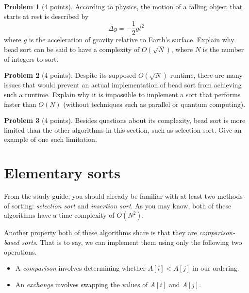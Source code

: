 \documentclass{exam}
\theoremstyle{definition}
\newtheorem{problem}{Problem}[section]
\theoremstyle{definition}
\begin{document}
\begin{problem}[4 points]
    According to physics, the motion of a falling object that starts at rest is described by
    $$ \Delta y = -\frac{1}{2} g t^2 $$
    where $ g $ is the acceleration of gravity relative to Earth's surface. Explain why bead sort can be said to have a complexity of $ O(\sqrt{N}) $, where $ N $ is the number of integers to sort.
\end{problem}

\begin{problem}[4 points]
    Despite its supposed $ O(\sqrt{N}) $ runtime, there are many issues that would prevent an actual implementation of bead sort from achieving such a runtime. 
    Explain why it is impossible to implement a sort that performs faster than $O(N)$ (without techniques such as parallel or quantum computing). 
\end{problem}


\begin{problem}[4 points]
    Besides questions about its complexity, bead sort is more limited than the other algorithms in this section, such as selection sort. Give an example of one such limitation.
\end{problem}



\section{Elementary sorts}

From the study guide, you should already be familiar with at least two methods of sorting: \textit{selection sort} and \textit{insertion sort}. As you may know, both of these algorithms have a time complexity of $O(N^2)$.

Another property both of these algorithms share is that they are \textit{comparison-based sorts}. That is to say, we can implement them using only the following two operations.

\begin{itemize}
    \item A \textit{comparison} involves determining whether $ A[i] < A[j] $ in our ordering.
    \item An \textit{exchange} involves swapping the values of $ A[i] $ and $ A[j] $.
\end{itemize}
\end{document}
